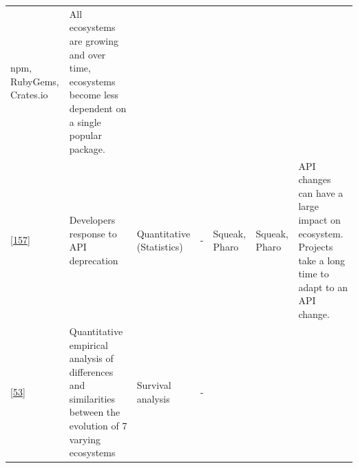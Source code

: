 \documentclass[]{book}
\begin{document}
\begin{longtable}[]{@{}lllllll@{}}
\begin{minipage}[t]{0.12\columnwidth}
npm, RubyGems, Crates.io\strut
\end{minipage} & \begin{minipage}[t]{0.10\columnwidth}\raggedright\strut
All ecosystems are growing and over time, ecosystems become less
dependent on a single popular package.\strut
\end{minipage}\tabularnewline
\begin{minipage}[t]{0.09\columnwidth}\raggedright\strut
{[}\protect\hyperlink{ref-Robbes2012}{157}{]}\strut
\end{minipage} & \begin{minipage}[t]{0.16\columnwidth}\raggedright\strut
Developers response to API deprecation\strut
\end{minipage} & \begin{minipage}[t]{0.17\columnwidth}\raggedright\strut
Quantitative (Statistics)\strut
\end{minipage} & \begin{minipage}[t]{0.07\columnwidth}\raggedright\strut
-\strut
\end{minipage} & \begin{minipage}[t]{0.10\columnwidth}\raggedright\strut
Squeak, Pharo\strut
\end{minipage} & \begin{minipage}[t]{0.12\columnwidth}\raggedright\strut
Squeak, Pharo\strut
\end{minipage} & \begin{minipage}[t]{0.10\columnwidth}\raggedright\strut
API changes can have a large impact on ecosystem. Projects take a long
time to adapt to an API change.\strut
\end{minipage}\tabularnewline
\begin{minipage}[t]{0.09\columnwidth}\raggedright\strut
{[}\protect\hyperlink{ref-Decan2018}{53}{]}\strut
\end{minipage} & \begin{minipage}[t]{0.16\columnwidth}\raggedright\strut
Quantitative empirical analysis of differences and similarities between
the evolution of 7 varying ecosystems\strut
\end{minipage} & \begin{minipage}[t]{0.17\columnwidth}\raggedright\strut
Survival analysis\strut
\end{minipage} & \begin{minipage}[t]{0.07\columnwidth}\raggedright\strut
-\strut
\end{minipage} & \begin{minipage}[t]{0.10\columnwidth}\raggedright\strut

\end{minipage}
\end{longtable}
\end{document}
